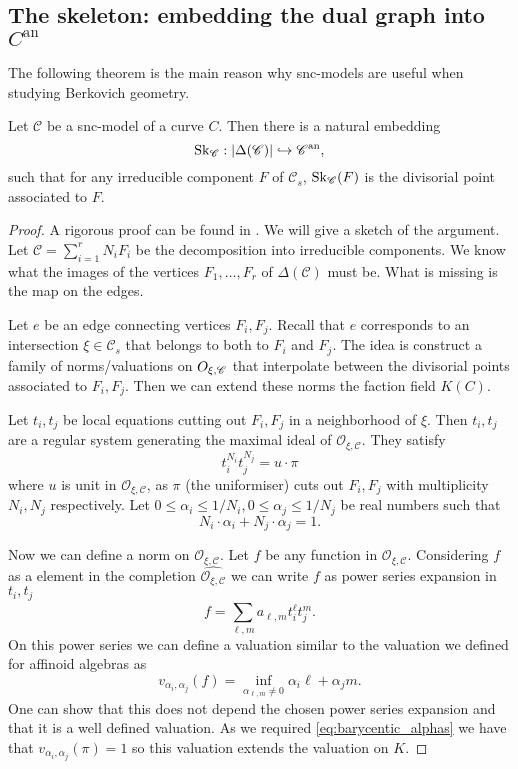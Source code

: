 \subsection{The skeleton: embedding the dual graph into $C^{\mathrm{an}}$}\label{sec:skeleton}
The following theorem is the main reason why snc-models are useful when studying Berkovich geometry. 
\begin{theorem}\label{thm:embedding_dual_graph}
	Let $\mathscr C$ be a snc-model of a curve $C$. 
	Then there is a natural embedding \[
		\operatorname{Sk}_{\mathscr C}:|\Delta(\mathscr C)| \hookrightarrow \mathscr C{}^{\text{an}}
	,\]
	such that for any irreducible component $F$ of $\mathscr C_s$,  $\operatorname{Sk}_{\mathscr C}(F)$ is the divisorial point associated to $F$. 
\end{theorem}
\begin{proof}
	A rigorous proof can be found in \cite[3.1.4]{mustataWeightFunctionsNonArchimedean2015}.
	We will give a sketch of the argument. 
	Let $\mathscr C = \sum_{i= 1}^{r} N_i F_i$ be the decomposition into irreducible components. 
	We know what the images of the vertices $F_1, \ldots, F_r$ of $\Delta(\mathscr C)$ must be.
	What is missing is the map on the edges. 

	Let $e$ be an edge connecting vertices $F_i, F_j$. 
	Recall that $e$ corresponds to an intersection $\xi \in \mathscr C_s$ that belongs to both to $F_i$ and $F_j$. 
	The idea is construct a family of norms/valuations on $\mathscr \mathcal{O}_{\xi, \mathscr C}$ that interpolate between the divisorial points associated to $F_i, F_j$. Then we can extend these norms the faction field $K(C)$. 

	Let $t_i, t_j$ be local equations cutting out $F_i, F_j$ in a neighborhood of  $\xi$. 
	Then $t_i, t_j$ are a regular system generating the maximal ideal of $\mathcal{O}_{\xi, \mathscr C}. $ 
	They satisfy \[
		t_i ^{N_i} t _j^{N_j} = u\cdot \pi
	\] 
	where $u$ is unit in $\mathcal{O}_{\xi, \mathscr C}$, as $\pi$ (the uniformiser) cuts out $F_i, F_j$ with multiplicity $N_i, N_j$ respectively.  
	Let $0 \le \alpha_i \le 1 / N_i,   0 \le \alpha_j \le 1 / N_j$ be real numbers such that \begin{equation}\label{eq:barycentic_alphas}
		N_i\cdot \alpha_i + N_j \cdot \alpha_j = 1
	.\end{equation}
	
	Now we can define a norm on $\mathcal{O}_{\xi, \mathscr C}$. 
	Let  $f$ be any function in $\mathcal{O}_{\xi, \mathscr C}$. 
	Considering $f$ as a element in the completion $\hat{\mathcal{O}_{\xi, \mathscr C}}$ we can write $f$ as power series expansion in $t_i, t_j$  \[
		f = \sum_{\ell, m}^{} a_{\ell, m} t_i ^{\ell} t_j^{m}
	.\] 
	On this power series we can define a valuation similar to the valuation we defined  for affinoid algebras as \[
		v_{\alpha_i, \alpha_j}(f) = \inf_{\alpha_{\ell, m} \ne 0}{\alpha_i \ell + \alpha_j m}
	.\] 
	One can show that this does not depend the chosen power series expansion and that it is a well defined valuation. 
	As we required \eqref{eq:barycentic_alphas} we have that  $v_{\alpha_i, \alpha_j}(\pi) = 1$ so this valuation extends the valuation on $K$. 
\end{proof}
